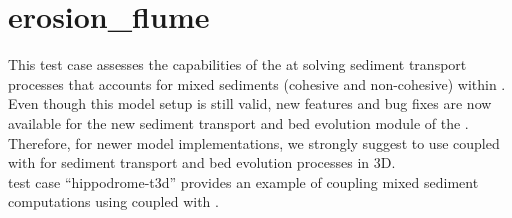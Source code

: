 \chapter{erosion\_flume}

This test case assesses the capabilities of the \telemacsystem at solving
sediment transport processes that accounts for mixed sediments
(cohesive and non-cohesive) within .\\

Even though this model setup is still valid, new features and bug fixes are now
available for the new sediment transport and bed evolution module \gaia of the
\telemacsystem.
Therefore, for newer model implementations, we strongly suggest to use
 coupled with \gaia for sediment transport and bed evolution
processes in 3D.\\

\gaia test case “hippodrome-t3d” provides an example of coupling mixed sediment
computations using  coupled with \gaia.
